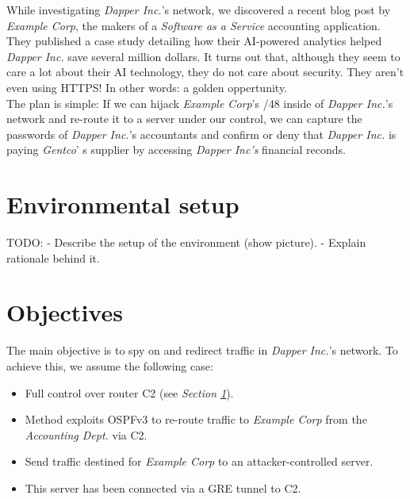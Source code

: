 \documentclass[11pt,a4paper,oneside]{article}
\newcommand{\lsection}[2]{\section{#1}\label{sec:#2}}
\begin{document}
    		While investigating \textit{Dapper Inc.}'s network, we discovered a recent blog post by \textit{Example Corp}, the makers of a \textit{Software as a Service} accounting application. They published a case study detailing how their AI-powered analytics helped \textit{Dapper Inc.} save several million dollars. It turns out that, although they seem to care a lot about their AI technology, they do not care about security. They aren't even using HTTPS! In other words: a golden oppertunity.\\
    		The plan is simple: If we can hijack \textit{Example Corp}'s /48 inside of \textit{Dapper Inc.}'s network and re-route it to a server under our control, we can capture the passwords of \textit{Dapper Inc.}'s accountants and confirm or deny that \textit{Dapper Inc.} is paying \textit{Gentco}' s supplier by accessing \textit{Dapper Inc's} financial reconds.
    		
    		
    \lsection{Environmental setup}{env_setup}
		TODO:
		- Describe the setup of the environment (show picture).
		- Explain rationale behind it.
		
		
    \lsection{Objectives}{objectives}
		The main objective is to spy on and redirect traffic in \textit{Dapper Inc.}'s network. To achieve this, we assume the following case:
		\begin{itemize}
			\item Full control over router C2 (see \textit{Section \ref{sec:env_setup}}).
			\item Method exploits OSPFv3 to re-route traffic to \textit{Example Corp} from the \textit{Accounting Dept.} via C2.
			\item Send traffic destined for \textit{Example Corp} to an attacker-controlled server.
			\item This server has been connected via a GRE tunnel to C2.
		\end{itemize}
		
\end{document}
